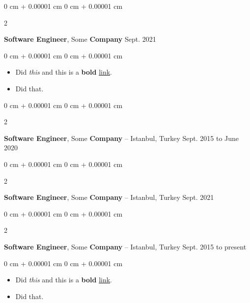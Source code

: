 \documentclass[10pt, letterpaper]{article}
\newenvironment{highlights}{
    \begin{itemize}[
        topsep=0.10 cm,
        parsep=0.10 cm,
        partopsep=0pt,
        itemsep=0pt,
        leftmargin=0 cm + 10pt
    ]
}{
    \end{itemize}
} %
\newenvironment{onecolentry}{
    \begin{adjustwidth}{
        0 cm + 0.00001 cm
    }{
        0 cm + 0.00001 cm
    }
}{
    \end{adjustwidth}
} %
\newenvironment{twocolentry}[2][]{
    \onecolentry
    \def\secondColumn{#2}
    \setcolumnwidth{\fill, 4.5 cm}
    \begin{paracol}{2}
}{
    \switchcolumn \raggedleft \secondColumn
    \end{paracol}
    \endonecolentry
} %
\begin{document}
        \vspace{0.2 cm}

        \begin{twocolentry}{
            Sept. 2021
        }
            \textbf{Software Engineer}, Some \textbf{Company}\end{twocolentry}

        \vspace{0.10 cm}
        \begin{onecolentry}
            \begin{highlights}
                \item Did \textit{this} and this is a \textbf{bold} \href{https://example.com}{link}.
                \item Did that.
            \end{highlights}
        \end{onecolentry}


        \vspace{0.2 cm}

        \begin{twocolentry}{
            Sept. 2015 to June 2020
        }
            \textbf{Software Engineer}, Some \textbf{Company} -- Istanbul, Turkey\end{twocolentry}



        \vspace{0.2 cm}

        \begin{twocolentry}{
            Sept. 2021
        }
            \textbf{Software Engineer}, Some \textbf{Company} -- Istanbul, Turkey\end{twocolentry}



        \vspace{0.2 cm}

        \begin{twocolentry}{
            Sept. 2015 to present
        }
            \textbf{Software Engineer}, Some \textbf{Company} -- Istanbul, Turkey\end{twocolentry}

        \vspace{0.10 cm}
        \begin{onecolentry}
            \begin{highlights}
                \item Did \textit{this} and this is a \textbf{bold} \href{https://example.com}{link}.
                \item Did that.
            \end{highlights}
        \end{onecolentry}
\end{document}
